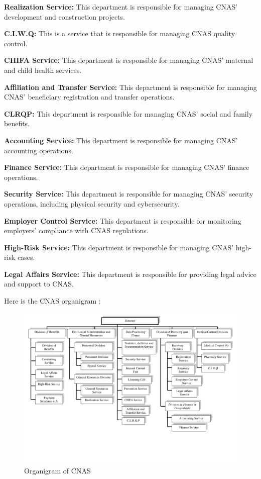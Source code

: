 \textbf{Realization Service:} This department is responsible for managing CNAS' development and construction projects.

\textbf{C.I.W.Q:} This is a service that is responsible for managing CNAS quality control.

\textbf{CHIFA Service:} This department is responsible for managing CNAS' maternal and child health services.

\textbf{Affiliation and Transfer Service:} This department is responsible for managing CNAS' beneficiary registration and transfer operations.

\textbf{CLRQP:} This department is responsible for managing CNAS' social and family benefits.

\textbf{Accounting Service:} This department is responsible for managing CNAS' accounting operations.

\textbf{Finance Service:} This department is responsible for managing CNAS' finance operations.

\textbf{Security Service:} This department is responsible for managing CNAS' security operations, including physical security and cybersecurity.

\textbf{Employer Control Service:} This department is responsible for monitoring employers' compliance with CNAS regulations.

\textbf{High-Risk Service:} This department is responsible for managing CNAS' high-risk cases.

\textbf{Legal Affairs Service:} This department is responsible for providing legal advice and support to CNAS.
\medskip

Here is the CNAS organigram : 
\begin{figure}[h]
  \centering
  \includegraphics[width=1.0\textwidth]{organigram.png}
  \caption{Organigram of CNAS}
  \label{fig:organigram}
\end{figure}
